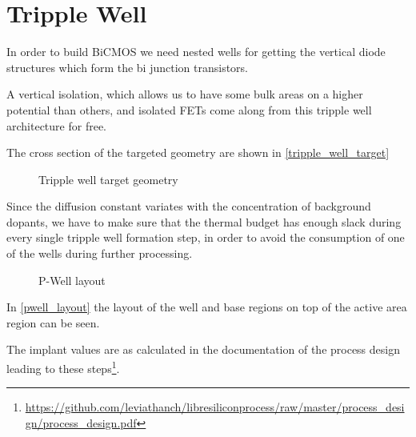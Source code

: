 \section{Tripple Well}\label{tripple_well_chapter}

In order to build BiCMOS we need nested wells for getting the vertical diode structures which form the bi junction transistors.

A vertical isolation, which allows us to have some bulk areas on a higher potential than others, and isolated FETs come along from this tripple well architecture for free.

The cross section of the targeted geometry are shown in \autoref{tripple_well_target}

\begin{figure}[H]
	\centering
	\begin{tikzpicture}[node distance = 3cm, auto, thick,scale=\CrossAndTopSectionBig, every node/.style={transform shape}]
		
	\end{tikzpicture}
	\caption{Tripple well target geometry}
	\label{tripple_well_target}
\end{figure}

Since the diffusion constant variates with the concentration of background dopants, we have to make sure that the thermal budget has enough slack during every single tripple well formation step, in order to avoid the consumption of one of the wells during further processing.

\begin{figure}[H]
	\centering
	\begin{tikzpicture}[node distance =1cm, auto, thick,scale=\VLSILayout, every node/.style={transform shape}]
		
	\end{tikzpicture}
	\caption{P-Well layout}
	\label{pwell_layout}
\end{figure}

In \autoref{pwell_layout} the layout of the well and base regions on top of the active area region can be seen.

The implant values are as calculated in the documentation of the process design leading to these steps\footnote{\url{https://github.com/leviathanch/libresiliconprocess/raw/master/process_design/process_design.pdf}}.

\newpage


\newpage



